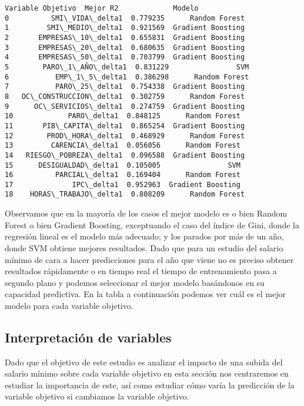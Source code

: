 \documentclass[11pt]{article}
\begin{document}
    
    \begin{Verbatim}[commandchars=\\\{\}]
         Variable Objetivo  Mejor R2             Modelo
0          SMI\_VIDA\_delta1  0.779235      Random Forest
1         SMI\_MEDIO\_delta1  0.921569  Gradient Boosting
2       EMPRESAS\_10\_delta1  0.655831  Gradient Boosting
3       EMPRESAS\_20\_delta1  0.680635  Gradient Boosting
4       EMPRESAS\_50\_delta1  0.703799  Gradient Boosting
5        PARO\_1\_AÑO\_delta1  0.831229                SVM
6           EMP\_1\_5\_delta1  0.386298      Random Forest
7           PARO\_25\_delta1  0.754338  Gradient Boosting
8   OC\_CONSTRUCCION\_delta1  0.302759      Random Forest
9      OC\_SERVICIOS\_delta1  0.274759  Gradient Boosting
10             PARO\_delta1  0.848125      Random Forest
11       PIB\_CAPITA\_delta1  0.865254  Gradient Boosting
12        PROD\_HORA\_delta1  0.468929      Random Forest
13         CARENCIA\_delta1  0.056056      Random Forest
14   RIESGO\_POBREZA\_delta1  0.096588  Gradient Boosting
15      DESIGUALDAD\_delta1  0.105005                SVM
16          PARCIAL\_delta1  0.169404      Random Forest
17              IPC\_delta1  0.952963  Gradient Boosting
18    HORAS\_TRABAJO\_delta1  0.808209      Random Forest
    \end{Verbatim}

    
    Observamos que en la mayoría de los casos el mejor modelo es o bien
Random Forest o bien Gradient Boosting, exceptuando el caso del índice
de Gini, donde la regresión lineal es el modelo más adecuado; y los
parados por más de un año, donde SVM obtiene mejores resultados. Dado
que para un estudio del salario mínimo de cara a hacer predicciones para
el año que viene no es preciso obtener resultados rápidamente o en
tiempo real el tiempo de entrenamiento pasa a segundo plano y podemos
seleccionar el mejor modelo basándonos en su capacidad predictiva. En la
tabla a continuación podemos ver cuál es el mejor modelo para cada
variable objetivo.

    \subsection{Interpretación de
variables}\label{interpretaciuxf3n-de-variables}

    Dado que el objetivo de este estudio es analizar el impacto de una
subida del salario mínimo sobre cada variable objetivo en esta sección
nos centraremos en estudiar la importancia de este, así como estudiar
cómo varía la predicción de la variable objetivo si cambiamos la
variable objetivo.
\end{document}
